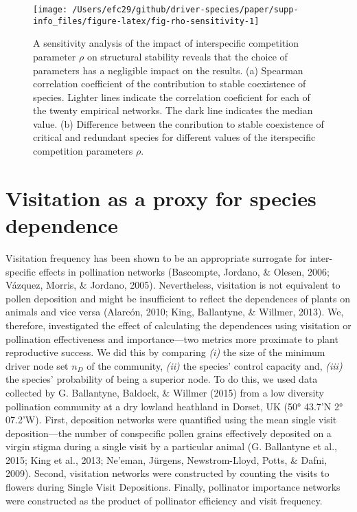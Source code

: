 \documentclass[a4paper]{artikel1}
\theoremstyle{definition}
\theoremstyle{definition}
\theoremstyle{definition}
\theoremstyle{remark}
\begin{document}
\begin{figure}[p]

{\centering \texttt{[image: /Users/efc29/github/driver-species/paper/supp-info\_files/figure-latex/fig-rho-sensitivity-1]} 

}

\caption{A sensitivity analysis of the impact of interspecific competition parameter $\rho$ on structural stability reveals that the choice of parameters has a negligible impact on the results. (a) Spearman correlation coefficient of the contribution to stable coexistence of species. Lighter lines indicate the correlation coeficient for each of the twenty empirical networks. The dark line indicates the median value. (b) Difference between the conribution to stable coexistence of critical and redundant species for different values of the iterspecific competition parameters $\rho$.}\label{fig:fig-rho-sensitivity}
\end{figure}

\clearpage 

\section{Visitation as a proxy for species
dependence}\label{visitation-as-proxy}

Visitation frequency has been shown to be an appropriate surrogate for
inter-specific effects in pollination networks (Bascompte, Jordano, \&
Olesen, 2006; Vázquez, Morris, \& Jordano, 2005). Nevertheless,
visitation is not equivalent to pollen deposition and might be
insufficient to reflect the dependences of plants on animals and vice
versa (Alarcón, 2010; King, Ballantyne, \& Willmer, 2013). We,
therefore, investigated the effect of calculating the dependences using
visitation or pollination effectiveness and importance---two metrics
more proximate to plant reproductive success. We did this by comparing
\emph{(i)} the size of the minimum driver node set \(n_D\) of the
community, \emph{(ii)} the species' control capacity and, \emph{(iii)}
the species' probability of being a superior node. To do this, we used
data collected by G. Ballantyne, Baldock, \& Willmer (2015) from a low
diversity pollination community at a dry lowland heathland in Dorset, UK
(50° 43.7'N 2° 07.2'W). First, deposition networks were quantified using
the mean single visit deposition---the number of conspecific pollen
grains effectively deposited on a virgin stigma during a single visit by
a particular animal (G. Ballantyne et al., 2015; King et al., 2013;
Ne'eman, Jürgens, Newstrom-Lloyd, Potts, \& Dafni, 2009). Second,
visitation networks were constructed by counting the visits to flowers
during Single Visit Depositions. Finally, pollinator importance networks
were constructed as the product of pollinator efficiency and visit
frequency.
\end{document}
